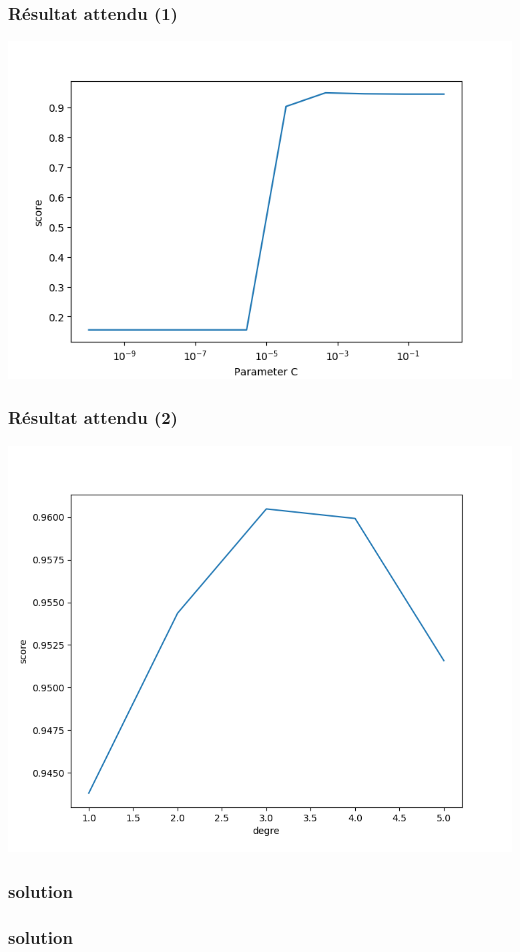 \documentclass[11pt]{beamer}
\newenvironment{slide}[1]{%
\begin{frame}[environment=slide]
\frametitle{#1}
}{%
\end{frame}
}
\newcommand{\Python}[1]{
	{\small	}
}
\begin{document}
\begin{slide}{Résultat attendu (1)}
\includegraphics[scale=0.6]{ex904}
\end{slide}

\begin{slide}{Résultat attendu (2)}
\includegraphics[scale=0.6]{ex905}
\end{slide}

\begin{slide}{solution}
\Python{ex904}
\end{slide}
\begin{slide}{solution}
\Python{ex905}
\end{slide}
\end{document}
